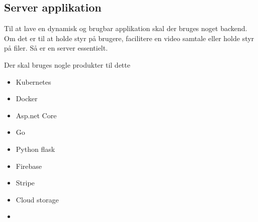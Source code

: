 \subsection{Server applikation}

Til at lave en dynamisk og brugbar applikation skal der bruges noget backend. Om det er til at holde styr på brugere, facilitere en video samtale eller holde styr på filer. Så er en server essentielt.

Der skal bruges nogle produkter til dette

\begin{itemize}
    \item Kubernetes
    \item Docker
    \item Asp.net Core
    \item Go
    \item Python flask
    \item Firebase
    \item Stripe
    \item Cloud storage
    \item 
\end{itemize}